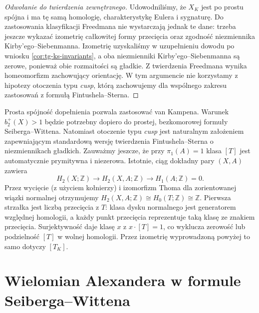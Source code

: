 \begin{proof}[Odwołanie do twierdzenia zewnętrznego]
Udowodniliśmy, że $X_K$ jest po prostu spójna i ma
tę samą homologię, charakterystykę Eulera i sygnaturę.
Do zastosowania klasyfikacji Freedmana nie wystarczają
jednak te dane: trzeba jeszcze wykazać izometrię
całkowitej formy przecięcia oraz zgodność niezmiennika
Kirby'ego--Siebenmanna. Izometrię uzyskaliśmy
w uzupełnieniu dowodu po wniosku
\ref{cor:tg-ks-invariants}, a oba niezmienniki
Kirby'ego--Siebenmanna są zerowe, ponieważ obie
rozmaitości są gładkie. Z twierdzenia Freedmana
wynika homeomorfizm zachowujący orientację.
W tym argumencie nie korzystamy z hipotezy
otoczenia typu \emph{cusp}, którą zachowujemy
dla wspólnego zakresu zastosowań z formułą
Fintushela--Sterna.
\end{proof}

\begin{uwaga}
Prosta spójność dopełnienia pozwala zastosować
van Kampena. Warunek $b_2^+(X)>1$ będzie potrzebny
dopiero do prostej, bezkomorowej formuły Seiberga--Wittena.
Natomiast otoczenie typu \emph{cusp} jest naturalnym
założeniem zapewniającym standardową wersję twierdzenia
Fintushela--Sterna o niezmiennikach gładkich.
Zauważmy jeszcze, że przy $\pi_1(A)=1$ klasa
$[T]$ jest automatycznie prymitywna i niezerowa.
Istotnie, ciąg dokładny pary $(X,A)$ zawiera
\[
H_2(X;\mathbb Z)\longrightarrow H_2(X,A;\mathbb Z)
\longrightarrow H_1(A;\mathbb Z)=0.
\]
Przez wycięcie (z użyciem kołnierzy) i izomorfizm
Thoma dla zorientowanej wiązki normalnej otrzymujemy
$H_2(X,A;\mathbb Z)\cong H_0(T;\mathbb Z)\cong\mathbb Z$.
Pierwsza strzałka jest liczbą przecięcia z $T$:
klasa dysku normalnego jest generatorem względnej
homologii, a każdy punkt przecięcia reprezentuje
taką klasę ze znakiem przecięcia. Surjektywność daje
klasę $x$ z $x\cdot[T]=1$, co wyklucza
zerowość lub podzielność $[T]$ w wolnej homologii.
Przez izometrię wyprowadzoną powyżej to samo
dotyczy $[T_K]$.
\end{uwaga}

\section{Wielomian Alexandera w formule Seiberga--Wittena}
\label{sec:tg-ks-sw}


